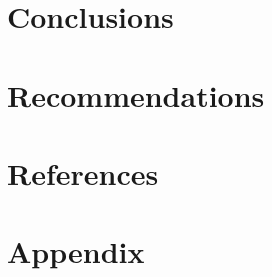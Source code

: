 \documentclass{article}
\begin{document}
	\newpage\vspace*{-30pt}
	\section{Conclusions}
	\newpage\vspace*{-30pt}
	
	\section{Recommendations}  		
	\newpage\vspace*{-30pt}
	
	
	\section{References}		
	\newpage\vspace*{-30pt}
	
	
	\section{Appendix}
	
\end{document}
